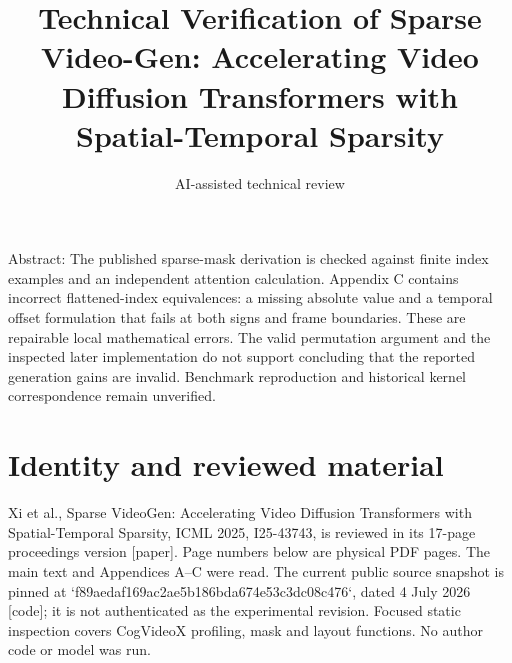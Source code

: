 \documentclass[10pt]{article}
\title{Technical Verification of
Sparse Video-Gen: Accelerating Video Diffusion Transformers with Spatial-Temporal Sparsity}
\author{AI-assisted technical review}
\date{}
\begin{document}
\maketitle
Abstract: The published sparse-mask derivation is checked against finite index examples and an independent attention calculation. Appendix C contains incorrect flattened-index equivalences: a missing absolute value and a temporal offset formulation that fails at both signs and frame boundaries. These are repairable local mathematical errors. The valid permutation argument and the inspected later implementation do not support concluding that the reported generation gains are invalid. Benchmark reproduction and historical kernel correspondence remain unverified.\par
\section*{Identity and reviewed material}
Xi et al., Sparse VideoGen: Accelerating Video Diffusion Transformers with Spatial-Temporal Sparsity, ICML 2025, I25-43743, is reviewed in its 17-page proceedings version [paper]. Page numbers below are physical PDF pages. The main text and Appendices A–C were read. The current public source snapshot is pinned at `f89aedaf169ac2ae5b186bda674e53c3dc08c476`, dated 4 July 2026 [code]; it is not authenticated as the experimental revision. Focused static inspection covers CogVideoX profiling, mask and layout functions. No author code or model was run.\par
\end{document}
